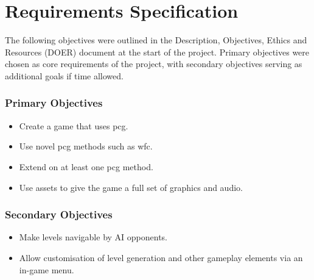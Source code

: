\chapter{Requirements Specification}
The following objectives were outlined in the Description, Objectives, Ethics and Resources (DOER) document at the start of the project. Primary objectives were chosen as core requirements of the project, with secondary objectives serving as additional goals if time allowed.
\subsection*{Primary Objectives}
\begin{itemize}
    \item Create a game that uses \acrlong{pcg}.
    \item Use novel \acrshort{pcg} methods such as \acrlong{wfc}.
    \item Extend on at least one \acrshort{pcg} method.
    \item Use assets to give the game a full set of graphics and audio.
\end{itemize}
\subsection*{Secondary Objectives}
\begin{itemize}
    \item Make levels navigable by AI opponents.
    \item Allow customisation of level generation and other gameplay elements via an in-game menu.
\end{itemize}
